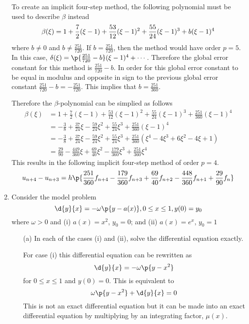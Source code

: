 \documentclass[11pt]{article}
\begin{document}
\begin{enumerate}
        To create an implicit four-step method, the following polynomial must
        be used to describe $\beta$ instead
        \[
            \beta(\xi) = 1 + \frac{7}{2}(\xi - 1) + \frac{53}{12}(\xi - 1)^2 + \frac{55}{24}(\xi - 1)^3 + b(\xi - 1)^4 \\
        \]
        where $b \neq 0$ and $b \neq \frac{251}{720}$.
        If $b = \frac{251}{720}$, then the method would have order $p = 5$.
        In this case, $\delta(\xi) = \p{\frac{251}{720} - b}(\xi - 1)^4 + \cdots$.
        Therefore the global error constant for this method is $\frac{251}{720} - b$.
        In order for this global error constant to be equal in modulus and
        opposite in sign to the previous global error constant
        $\frac{251}{720} - b = -\frac{251}{720}$.
        This implies that $b = \frac{251}{360}$.

        Therefore the $\beta$-polynomial can be simplied as follows
        \begin{align*}
            \beta(\xi) &= 1 + \frac{7}{2}(\xi - 1) + \frac{53}{12}(\xi - 1)^2 + \frac{55}{24}(\xi - 1)^3 + \frac{251}{360}(\xi - 1)^4 \\
            &= -\frac{3}{8} + \frac{37}{24}\xi - \frac{59}{24}\xi^2 + \frac{55}{24}\xi^3 + \frac{251}{360}(\xi - 1)^4 \\
            &= -\frac{3}{8} + \frac{37}{24}\xi - \frac{59}{24}\xi^2 + \frac{55}{24}\xi^3 + \frac{251}{360}(\xi^4 -4 \xi^3 + 6 \xi^2 - 4\xi + 1) \\
            &= \frac{29}{90} - \frac{449}{360} \xi + \frac{69}{40} \xi^2 - \frac{179}{360} \xi^3 + \frac{251}{360} \xi^4
        \end{align*}
        This results in the following implicit four-step method of order $p=4$.
        \[
            u_{n+4} - u_{n+3} = h\p{\frac{251}{360}f_{n+4} - \frac{179}{360}f_{n+3} +
                \frac{69}{40}f_{n+2} - \frac{448}{360}f_{n+1} + \frac{29}{90}f_n}
        \]

    \item %
        Consider the model problem
        \[
            \d{y}{x} = -\omega\p{y - a(x)}, 0 \le x \le 1, y(0) = y_0
        \]
        where $\omega > 0$ and (i) $a(x) = x^2$, $y_0 = 0$; and (ii) $a(x) = e^x$, $y_0 = 1$
        \begin{enumerate}
            \item[(a)] %
                In each of the cases (i) and (ii), solve the differential
                equation exactly.

                For case (i) this differential equation can be rewritten as
                \[
                    \d{y}{x} = -\omega\p{y - x^2}
                \]
                for $0 \le x \le 1$ and $y(0) = 0$.
                This is equivalent to 
                \[
                    \omega\p{y - x^2} + \d{y}{x} = 0
                \]
                This is not an exact differential equation but it can be made
                into an exact differential equation by multiplying by an
                integrating factor, $\mu(x)$.


\end{enumerate}
\end{enumerate}
\end{document}
